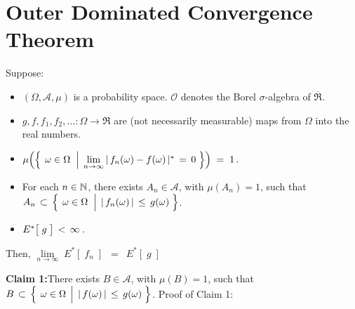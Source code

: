 

\section{Outer Dominated Convergence Theorem}
\setcounter{theorem}{0}
\setcounter{equation}{0}


\renewcommand{\theenumi}{\roman{enumi}}
\renewcommand{\labelenumi}{\textnormal{(\theenumi)}$\;\;$}


\begin{theorem}
\mbox{}\vskip 0.1cm
\noindent
Suppose:
\begin{itemize}
\item
	$(\Omega,\mathcal{A},\mu)$ is a probability space.
	$\mathcal{O}$ denotes the Borel $\sigma$-algebra of $\overline{\Re}$.
\item
	$g, f, f_{1}, f_{2}, \ldots : \Omega \longrightarrow \Re$ are (not necessarily measurable)
	maps from $\Omega$ into the real numbers.
\item
	$\mu\!\left(\left\{\;
		\left.
		\omega \overset{{\color{white}.}}{\in} \Omega
		\;\;\right\vert\;
		\underset{n\rightarrow\infty}{\lim}\,\vert\, f_{n}(\omega) - f(\omega) \,\vert^{*} \,=\, 0
	\;\right\}\right)
	\; = \; 1\,.$
\item
	For each $n \in \mathbb{N}$, there exists $A_{n} \in \mathcal{A}$, with $\mu(A_{n}) = 1$, such that\;
	$A_{n}
	\,\subset\,
		\left\{\;
			\left.
			\omega \overset{{\color{white}.}}{\in} \Omega
			\;\;\right\vert\;
			\vert\,f_{n}(\omega)\,\vert \,\leq\, g(\omega)
		\;\right\}$.
\item
	$E^{*}\!\left[\;\overset{{\color{white}.}}{g}\;\right] \,<\, \infty$\,.
\end{itemize}
Then, $\underset{n\rightarrow\infty}{\lim}\;E^{*}\!\left[\;f_{n}\;\right]$ \,$=$\, $E^{*}\!\left[\;g\;\right]$
\end{theorem}
\proof
\vskip 0.3cm
\noindent
\textbf{Claim 1:}\quad There exists $B \in \mathcal{A}$, with $\mu(B)=1$, such that\,
$B \,\subset\, \left\{\;\left.\omega\overset{{\color{white}.}}{\in}\Omega\,\;\right\vert\;\vert\,f(\omega)\,\vert\,\leq\,g(\omega)\;\right\}$.
\vskip 0.1cm
\noindent
Proof of Claim 1:\;\;
